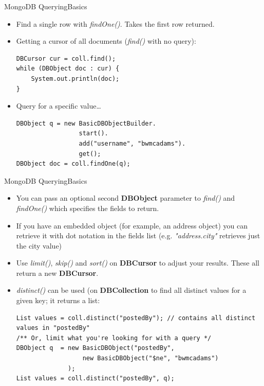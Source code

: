 \documentclass{beamer}
\begin{document}
\begin{frame}[fragile]{MongoDB Querying}{Basics}
    \begin{itemize}
        \item Find a single row with {\em findOne()}.  Takes the first row returned.
        \item<2-> Getting a cursor of all documents ({\em find()} with no query):\\ 
\begin{lstlisting}
DBCursor cur = coll.find();
while (DBObject doc : cur) {
    System.out.println(doc);
}
\end{lstlisting}
        \item<3-> Query for a specific value\ldots  \\
\begin{lstlisting}
DBObject q = new BasicDBObjectBuilder.
                 start().
                 add("username", "bwmcadams").
                 get();
DBObject doc = coll.findOne(q); 
\end{lstlisting}
    \end{itemize}
\end{frame}

\begin{frame}[fragile]{MongoDB Querying}{Basics}
    \begin{itemize}
        \item You can pass an optional second {\bf DBObject} parameter to {\em find()} and {\em findOne()} which specifies the fields to return. 
        \item If you have an embedded object (for example, an address object) you can retrieve it with dot notation in the fields list (e.g. {\em "address.city"} retrieves just the city value)
        \item Use {\em limit()}, {\em skip()} and {\em sort()} on {\bf DBCursor} to adjust your results.  These all return a new {\bf DBCursor}.  
        \item {\em distinct()} can be used (on {\bf DBCollection} to find all distinct values for a given key; it returns a list:
            \begin{lstlisting}
List values = coll.distinct("postedBy"); // contains all distinct values in "postedBy"
/** Or, limit what you're looking for with a query */
DBObject q  = new BasicDBObject("postedBy", 
                  new BasicDBObject("$ne", "bwmcadams")
              );
List values = coll.distinct("postedBy", q);
            \end{lstlisting}
    \end{itemize}
\end{frame}
\end{document}
